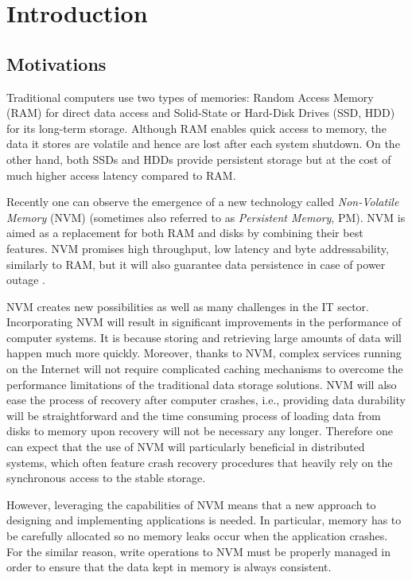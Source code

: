 \chapter{Introduction} \label{Introduction}

\section{Motivations}

Traditional computers use two types of memories: Random Access Memory (RAM) for direct data access and Solid-State or Hard-Disk Drives (SSD, HDD) for its long-term storage. Although RAM enables quick access to memory, the data it stores are volatile and hence are lost after each system shutdown. On the other hand, both SSDs and HDDs provide persistent storage but at the cost of much higher access latency compared to RAM.

Recently one can observe the emergence of a new technology called \emph{Non-Volatile Memory} (NVM) (sometimes also referred to as \emph{Persistent Memory}, PM). NVM is aimed as a replacement for both RAM and disks by combining their best features. NVM promises high throughput, low latency and byte addressability, similarly to RAM, but it will also guarantee data persistence in case of power outage \cite{NvmPerformanceArticle}. 

NVM creates new possibilities as well as many challenges in the IT sector. Incorporating NVM will result in significant improvements in the performance of computer systems. It is because storing and retrieving large amounts of data will happen much more quickly. Moreover, thanks to NVM, complex services running on the Internet will not require complicated caching mechanisms to overcome the performance limitations of the traditional data storage solutions. NVM will also ease the process of recovery after computer crashes, i.e., providing data durability will be straightforward and the time consuming process of loading data from disks to memory upon recovery will not be necessary any longer. Therefore one can expect that the use of NVM will particularly beneficial in distributed systems, which often feature crash recovery procedures that heavily rely on the synchronous access to the stable storage. 

However, leveraging the capabilities of NVM means that a new approach to designing and implementing applications is needed. In particular, memory has to be carefully allocated so no memory leaks occur when the application crashes. For the similar reason, write operations to NVM must be properly managed in order to ensure that the data kept in memory is always consistent.

